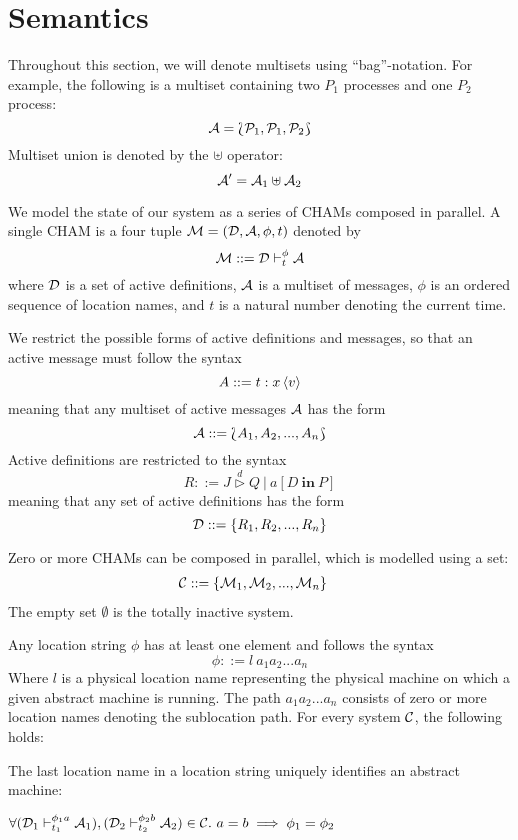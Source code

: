 \section{Semantics}
Throughout this section, we will denote multisets using ``bag''-notation. For
example, the following is a multiset containing two $P_1$ processes and one
$P_2$ process:
\begin{equation*}
 \mathcal{A} = \Lbag \mathcal{P}_1, \mathcal{P}_1, \mathcal{P}_2 \Rbag
\end{equation*}
Multiset union is denoted by the $\uplus$ operator:
\begin{equation*}
 \mathcal{A}' = \mathcal{A}_1 \uplus \mathcal{A}_2
\end{equation*}

We model the state of our system as a series of CHAMs composed in parallel. A
single CHAM is a four tuple $\mathcal{M} = (\mathcal{D}, \mathcal{A}, \phi, t)$ denoted by
\begin{equation*}
 \mathcal{M} ::= \mathcal{D} \vdash_{t}^{\phi} \mathcal{A}
\end{equation*}
where $\mathcal{D}$ is a set of active definitions, $\mathcal{A}$ is a multiset of messages,
$\phi$ is an ordered sequence of location names, and $t$ is a natural number
denoting the current time.

We restrict the possible forms of active definitions and messages, so that an
active message must follow the syntax
\begin{equation*}
 A ::= t : \atm x<v>
\end{equation*}
meaning that any multiset of active messages $\mathcal{A}$ has the form
\begin{equation*}
 \mathcal{A} ::= \Lbag A_1, A_2, ..., A_n \Rbag
\end{equation*}
Active definitions are restricted to the syntax
\begin{equation*}
 R ::= J \stackrel{d}{\triangleright} Q ~\big|~ a[D~\mathbf{in}~P]
\end{equation*}
meaning that any set of active definitions has the form
\begin{equation*}
 \mathcal{D} ::= \{ R_1, R_2, ..., R_n \}
\end{equation*}

Zero or more CHAMs can be composed in parallel, which
is modelled using a set:
\begin{align*}
 \mathcal{C} ::={}& \{ \mathcal{M}_1, \mathcal{M}_2, ..., \mathcal{M}_n \}
\end{align*}
The empty set $\emptyset$ is the totally inactive system.

Any location string $\phi$ has at least one element and follows the syntax
\begin{equation*}
 \phi ::= l~a_1 a_2 ... a_n
\end{equation*}
Where $l$ is a physical location name representing the physical machine on
which a given abstract machine is running. The path $a_1a_2...a_n$ consists of
zero or more location names denoting the sublocation path. For every system
$\mathcal{C}$, the following holds:
\begin{invariant}
 \label{thm:unique-loc}
 The last location name in a location string uniquely identifies an abstract
 machine:

 $\forall (\mathcal{D}_1 \vdash_{t_1}^{\phi_1 a} \mathcal{A}_1), (\mathcal{D}_2 \vdash_{t_2}^{\phi_2 b}
 \mathcal{A}_2) \in \mathcal{C}.~ a = b \implies \phi_1 = \phi_2$
\end{invariant}


